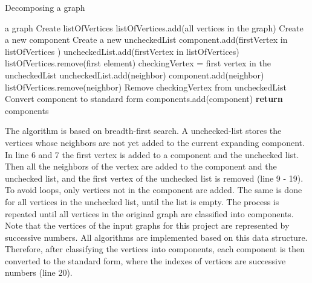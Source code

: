 \documentclass[a4paper]{report}
\begin{document}
		\begin{algorithm}
			\caption{Decomposing a graph}
			\label{alg:decompose}
			\begin{algorithmic}[1]
				\REQUIRE a graph
				\STATE Create listOfVertices 
				\STATE listOfVertices.add(all vertices in the graph)
				\STATE Create a new component
				\STATE Create a new uncheckedList
				\STATE component.add(firstVertex in listOfVertices )
				\STATE uncheckedList.add(firstVertex in listOfVertices)
				\STATE listOfVertices.remove(first element)
				\STATE checkingVertex = first vertex in the uncheckedList
				\STATE uncheckedList.add(neighbor)
				\STATE component.add(neighbor)
				\ENDIF
				\STATE listOfVertices.remove(neighbor)
				\ENDFOR
				\STATE Remove checkingVertex from uncheckedList
				\ENDWHILE
				\STATE Convert component to standard form
				\STATE components.add(component)
				\ENDWHILE
				\STATE \textbf{return} components
				
			\end{algorithmic}
		\end{algorithm}
		The algorithm is based on breadth-first search. A unchecked-list stores the vertices whose neighbors are not yet added to the current expanding component. In line 6 and 7 the first vertex is added to a component and the unchecked list. Then all the neighbors of the vertex are added to the component and the unchecked list, and the first vertex of the unchecked list is removed (line 9 - 19). To avoid loops, only vertices not in the component are added. The same is done for all vertices in the unchecked list, until the list is empty. The process is repeated until all vertices in the original graph are classified into components.\\
		
		Note that the vertices of the input graphs for this project are represented by successive numbers. All algorithms are implemented based on this data structure. Therefore, after classifying the vertices into components, each component is then converted to the standard form, where the indexes of vertices are successive numbers (line 20).
		
\end{document}
